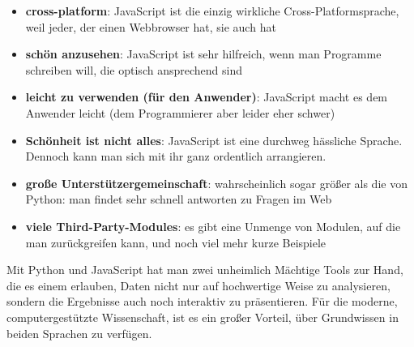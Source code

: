 \begin{itemize}
\itemsep1pt\parskip0pt
\item
  \textbf{cross-platform}: JavaScript ist die einzig wirkliche
  Cross-Platformsprache, weil jeder, der einen Webbrowser hat, sie auch
  hat
\item
  \textbf{schön anzusehen}: JavaScript ist sehr hilfreich, wenn man
  Programme schreiben will, die optisch ansprechend sind
\item
  \textbf{leicht zu verwenden (für den Anwender)}: JavaScript macht es
  dem Anwender leicht (dem Programmierer aber leider eher schwer)
\item
  \textbf{Schönheit ist nicht alles}: JavaScript ist eine durchweg
  hässliche Sprache. Dennoch kann man sich mit ihr ganz ordentlich
  arrangieren.
\item
  \textbf{große Unterstützergemeinschaft}: wahrscheinlich sogar größer
  als die von Python: man findet sehr schnell antworten zu Fragen im Web
\item
  \textbf{viele Third-Party-Modules}: es gibt eine Unmenge von Modulen,
  auf die man zurückgreifen kann, und noch viel mehr kurze Beispiele
\end{itemize}



Mit Python und JavaScript hat man zwei unheimlich Mächtige Tools zur
Hand, die es einem erlauben, Daten nicht nur auf hochwertige Weise zu
analysieren, sondern die Ergebnisse auch noch interaktiv zu
präsentieren. Für die moderne, computergestützte Wissenschaft, ist es
ein großer Vorteil, über Grundwissen in beiden Sprachen zu verfügen.


